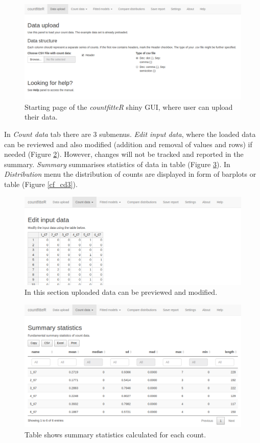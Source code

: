 \begin{figure}[htbp]
  \centering
  \includegraphics[width=0.99\columnwidth]{fig/cf_main.png}
  \caption{Starting page of the \emph{countfitteR} shiny GUI, where user can upload their data.}
    \label{cf_main}
\end{figure}

In \textit{Count data} tab there are 3 submenus. \textit{Edit input data}, where the loaded data can be reviewed and also modified (addition and removal of values and rows) if needed (Figure \ref{cf_cd1}). However, changes will not be tracked and reported in the summary. \textit{Summary} summarises statistics of data in table (Figure \ref{cf_cd2}). In \textit{Distribution} menu the distribution of counts are displayed in form of barplots or table (Figure \ref{cf_cd3}).

\begin{figure}[htbp]
  \centering
  \includegraphics[width=0.99\columnwidth]{fig/cf_cd1.png}
  \caption{In this section uploaded data can be previewed and modified.}
    \label{cf_cd1}
\end{figure}

\begin{figure}[htbp]
  \centering
  \includegraphics[width=0.99\columnwidth]{fig/cf_cd2.png}
  \caption{Table shows summary statistics calculated for each count.}
    \label{cf_cd2}
\end{figure}

